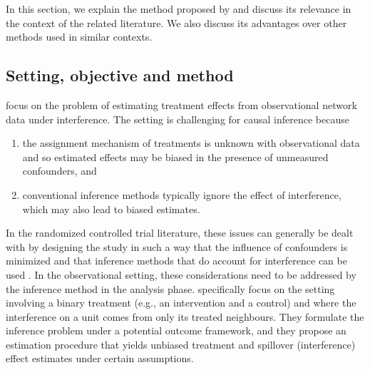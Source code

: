 \documentclass[10pt]{article}
\begin{document}
In this section, we explain the method proposed by \textcite{Forastiere:2021} and discuss its relevance in the context of the related literature. We also discuss its advantages over other methods used in similar contexts.

\subsection{Setting, objective and method}\label{sec:method}

\textcite{Forastiere:2021} focus on the problem of estimating treatment effects from observational network data under interference. The setting is challenging for causal inference because
\begin{enumerate}
\item
the assignment mechanism of treatments is unknown with observational data and so estimated effects may be biased in the presence of unmeasured confounders, and
\item
conventional inference methods typically ignore the effect of interference, which may also lead to biased estimates.
\end{enumerate}
In the randomized controlled trial literature, these issues can generally be dealt with by designing the study in such a way that the influence of confounders is minimized and that inference methods that do account for interference can be used \parencite[e.g.,][]{Saveski:2017,Jagadeesan:2020,Imai:2021,Doudchenko:2020}. In the observational setting, these considerations need to be addressed by the inference method in the analysis phase. \citeauthor{Forastiere:2021} specifically focus on the setting involving a binary treatment (e.g., an intervention and a control) and where the interference on a unit comes from only its treated neighbours. They formulate the inference problem under a potential outcome framework, and they propose an estimation procedure that yields unbiased treatment and spillover (interference) effect estimates under certain assumptions.
\\
\end{document}
